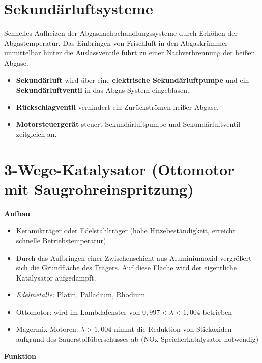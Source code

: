 \section{Sekundärluftsysteme}\label{sekundaerluftsysteme}

Schnelles Aufheizen der Abgasnachbehandlungssysteme durch Erhöhen der
Abgastemperatur. Das Einbringen von Frischluft in den Abgaskrümmer
unmittelbar hinter die Auslassventile führt zu einer Nachverbrennung der
heißen Abgase.

\begin{itemize}
\item
  \textbf{Sekundärluft} wird über eine \textbf{elektrische
  Sekundärluftpumpe} und ein \textbf{Sekundärluftventil} in das
  Abgas-System eingeblasen.
\item
  \textbf{Rückschlagventil} verhindert ein Zurückströmen heißer Abgase.
\item
  \textbf{Motorsteuergerät} steuert Sekundärluftpumpe und
  Sekundärluftventil zeitgleich an.
\end{itemize}

\section{3-Wege-Katalysator (Ottomotor mit
Saugrohreinspritzung)}\label{wege-katalysator-ottomotor-mit-saugrohreinspritzung}

\textbf{Aufbau}

\begin{itemize}
\item
  Keramikträger oder Edelstahlträger (hohe Hitzebeständigkeit, erreicht
  schnelle Betriebstemperatur)
\item
  Durch das Aufbringen einer Zwischenschicht aus Aluminiumoxid
  vergrößert sich die Grundfläche des Trägers. Auf diese Fläche wird der
  eigentliche Katalysator aufgedampft.
\item
  \emph{Edelmetalle:} Platin, Palladium, Rhodium
\item
  Ottomotor: wird im Lambdafenster von $0,997 <\lambda< 1,004$
  betrieben
\item
  Magermix-Motoren: $\lambda>1,004$ nimmt die Reduktion von
  Stickoxiden aufgrund des Sauerstoffüberschusses ab
  (NOx-Speicherkatalysator notwendig)
\end{itemize}

\textbf{Funktion}

